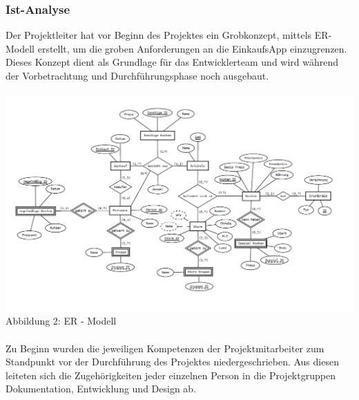 \documentclass[12pt,a4paper]{article}
\begin{document}
\subsubsection{Ist-Analyse}
Der Projektleiter hat vor Beginn des Projektes ein Grobkonzept, mittels ER-Modell erstellt, um die groben Anforderungen an die EinkaufsApp einzugrenzen. 
Dieses Konzept dient als Grundlage für das Entwicklerteam und wird während der Vorbetrachtung und Durchführungsphase noch ausgebaut.
\\
\\
\includegraphics[scale=0.6,origin=l]{EER-Modell.png}
\\
\footnotesize Abbildung 2: ER - Modell
\normalsize
\\
\\
Zu Beginn wurden die jeweiligen Kompetenzen der Projektmitarbeiter zum Standpunkt vor der Durchführung des Projektes niedergeschrieben. 
Aus diesen leiteten sich die Zugehörigkeiten jeder einzelnen Person in die Projektgruppen Dokumentation, Entwicklung und Design ab.
\\
\\
\end{document}
